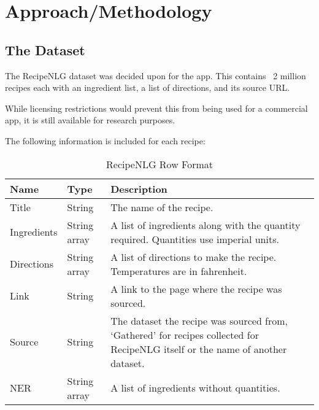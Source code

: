\section{Approach/Methodology}

\subsection{The Dataset}


The RecipeNLG dataset \cite{bien_recipenlg_2020} was decided upon for the \chef{} app. This contains ~2 million recipes
each with an ingredient list, a list of directions, and its source URL.

While licensing restrictions would prevent this from being used for a commercial app, it is still available for
research purposes.

The following information is included for each recipe:

\begin{table}[h!]
    \begin{tabulary}{\textwidth}{|l|l|L|}
        \hline
        \textbf{Name} & \textbf{Type} & \textbf{Description} \\\hline

        Title & String & The name of the recipe. \\\hline

        Ingredients & String array & A list of ingredients along with the quantity required. Quantities use imperial units. \\\hline

        Directions & String array & A list of directions to make the recipe. Temperatures are in fahrenheit. \\\hline

        Link & String & A link to the page where the recipe was sourced. \\\hline

        Source & String & The dataset the recipe was sourced from, \enquote*{Gathered} for recipes collected for RecipeNLG itself or the name of another dataset. \\\hline

        NER & String array & A list of ingredients without quantities. \\\hline
    \end{tabulary}

    \caption{RecipeNLG Row Format}
    \label{tab:recipenlg_row_format}
\end{table}

